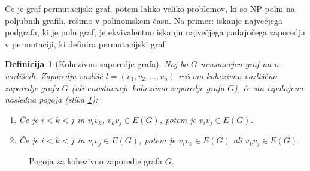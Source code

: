 \documentclass[a4paper, 12pt]{book}
\newtheorem{definicija}{Definicija}[chapter]
\begin{document}
Če je graf permutacijski graf, potem lahko veliko problemov, ki so NP-polni na poljubnih grafih, rešimo v polinomskem času. Na primer: iskanje največjega podgrafa, ki je poln graf, je ekvivalentno iskanju največjega padajočega zaporedja v permutaciji, ki definira permutacijski graf.

\begin{definicija}[Kohezivno zaporedje grafa]
\label{def_kohezivno_zaporedje}
    Naj bo $G$ neusmerjen graf na $n$ vozliščih. 
    Zaporedju vozlišč $l = (v_1, v_2, ..., v_n)$ rečemo kohezivno vozliščno zaporedje grafa $G$ (ali enostavneje kohezivno zaporedje grafa $G$), če sta izpolnjena nasledna pogoja (slika \ref{graf_kohezivno_zaporedje_ab}):
    \begin{enumerate}[label=(\alph*)]
        \item Če je $i < k < j$ in $v_iv_k$, $v_kv_j \in E(G)$, potem je $v_iv_j \in E(G)$.
        \item Če je $i < k < j$ in $v_iv_j \in E(G)$, potem je $v_iv_k \in E(G)$ ali $v_kv_j \in E(G)$.
    \end{enumerate}
\end{definicija}

\begin{figure}[h]
    \begin{center}        
    \end{center}
    \caption{Pogoja za kohezivno zaporedje grafa $G$.}
    \label{graf_kohezivno_zaporedje_ab}
\end{figure}
\end{document}
